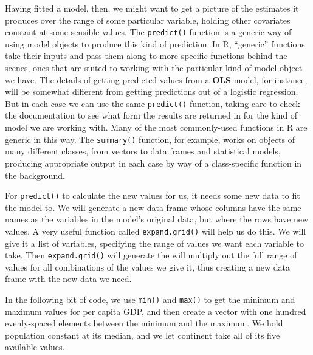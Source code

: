 \documentclass[]{book}
\begin{document}
Having fitted a model, then, we might want to get a picture of the estimates it produces over the range of some particular variable, holding other covariates constant at some sensible values. The \texttt{predict()} function is a generic way of using model objects to produce this kind of prediction. In R, ``generic'' functions take their inputs and pass them along to more specific functions behind the scenes, ones that are suited to working with the particular kind of model object we have. The details of getting predicted values from a \textbf{OLS} model, for instance, will be somewhat different from getting predictions out of a logistic regression. But in each case we can use the same \texttt{predict()} function, taking care to check the documentation to see what form the results are returned in for the kind of model we are working with. Many of the most commonly-used functions in R are generic in this way. The \texttt{summary()} function, for example, works on objects of many different classes, from vectors to data frames and statistical models, producing appropriate output in each case by way of a class-specific function in the background.

For \texttt{predict()} to calculate the new values for us, it needs some new data to fit the model to. We will generate a new data frame whose columns have the same names as the variables in the model's original data, but where the rows have new values. A very useful function called \texttt{expand.grid()} will help us do this. We will give it a list of variables, specifying the range of values we want each variable to take. Then \texttt{expand.grid()} will generate the will multiply out the full range of values for all combinations of the values we give it, thus creating a new data frame with the new data we need.

In the following bit of code, we use \texttt{min()} and \texttt{max()} to get the minimum and maximum values for per capita GDP, and then create a vector with one hundred evenly-spaced elements between the minimum and the maximum. We hold population constant at its median, and we let continent take all of its five available values.\\
\end{document}
